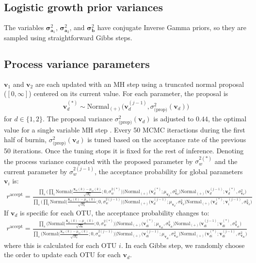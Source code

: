 \documentclass{article}
\newcommand{\var}{\sigma^2}
\newcommand{\Normaldist}{\text{Normal}}
\newcommand{\vara}[1]{\mathbf{\sigma}^2_{\mathbf{a}_#1}}
\newcommand{\varb}{\mathbf{\sigma}^2_{\mathbf{b}}}
\newcommand{\x}[2]{\mathbf{x}_{#2}(#1)}
\renewcommand{\v}[1]{\mathbf{v}_{#1}}
\newcommand{\dt}{\Delta_{k}}
\begin{document}
\subsection{Logistic growth prior variances}
The variables $\vara{1}$, $\vara{2}$, and $\varb$ have conjugate Inverse Gamma priors, so they are sampled using straightforward Gibbs steps.


\subsection{Process variance parameters}
$\v{1}$ and $\v{2}$ are each updated with an MH step using a truncated normal proposal ($[0,\infty]$) centered on its current value. For each parameter, the proposal is
\begin{align}
  \v{d}^{(*)} \sim \Normaldist_{(+)} \Big( \v{d}^{(j-1)}, \var_{\text{(prop)}}(\v{d}) \Big)
\end{align}
for $d \in \{1,2\}$. The proposal variance $\var_{\text{(prop)}}(\v{d})$ is adjusted to $0.44$, the optimal value for a single variable MH step \cite{cite:BDA}. Every 50 MCMC iteractions during the first half of burnin, $\var_{\text{(prop)}}(\v{d})$ is tuned based on the acceptance rate of the previous 50 iterations. Once the tuning stops it is fixed for the rest of inference. Denoting the process variance computed with the proposed parameter by $\sigma_w^{2 (*)}$ and the current parameter by $\sigma_w^{2 (j-1)}$, the acceptance probability for global parameters $\v{i}$ is:
\begin{align}
  r^{\text{accept}}= \frac{
    \prod_s \Big( \prod_i
      \Normaldist \Big( \frac{\x{k}{si}-\mu_{si}(k)}{\sqrt{\dt}} ; 0,\sigma_w^{2 (*)} \Big) \Big)
    \Normaldist_{(+)} \Big( \v{d}^{(*)} ; \mu_{\v{d}}, \var_{\v{d}} \Big)
    \Normaldist_{(+)} \Big( \v{d}^{(j-1)} ; \v{d}^{(*)}, \var_{\v{d}} \Big)
    }
    {
    \prod_s \Big( \prod_i
      \Normaldist \Big( \frac{\x{k}{si}-\mu_{si}(k)}{\sqrt{\dt}} ; 0,\sigma_w^{2 (j-1)} \Big) \Big)
    \Normaldist_{(+)} \Big( \v{d}^{(j-1)} ; \mu_{\v{d}}, \var_{\v{d}} \Big)
    \Normaldist_{(+)} \Big( \v{d}^{(*)} ; \v{i}^{(j-1)}, \var_{\v{d}} \Big)
    }
\end{align}
If $\v{d}$ is specific for each OTU, the acceptance probability changes to:
\begin{align}
  r^{\text{accept}}= \frac{
    \prod_s \Big(
      \Normaldist \Big( \frac{\x{k}{si}-\mu_{si}(k)}{\sqrt{\dt}} ; 0,\sigma_w^{2 (*)} \Big) \Big)
    \Normaldist_{(+)} \Big( \v{di}^{(*)} ; \mu_{\v{di}}, \var_{\v{di}} \Big)
    \Normaldist_{(+)} \Big( \v{di}^{(j-1)} ; \v{di}^{(*)}, \var_{\v{di}} \Big)
    }
    {
    \prod_s \Big(
      \Normaldist \Big( \frac{\x{k}{si}-\mu_{si}(k)}{\sqrt{\dt}} ; 0,\sigma_w^{2 (j-1)} \Big) \Big)
    \Normaldist_{(+)} \Big( \v{di}^{(j-1)} ; \mu_{\v{di}}, \var_{\v{di}} \Big)
    \Normaldist_{(+)} \Big( \v{di}^{(*)} ; \v{di}^{(j-1)}, \var_{\v{di}} \Big)
    }
\end{align}
where this is calculated for each OTU $i$. In each Gibbs step, we randomly choose the order to update each OTU for each $\v{d}$.
\end{document}
